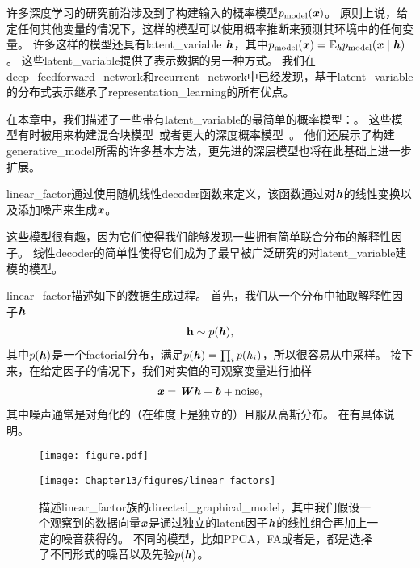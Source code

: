 \chapter{}
\label{chap:linear_factor_models}




许多深度学习的研究前沿涉及到了构建输入的概率模型$p_{\text{model}}(\boldsymbol{\mathit{x}})$。
原则上说，给定任何其他变量的情况下，这样的模型可以使用概率推断来预测其环境中的任何变量。
许多这样的模型还具有\gls{latent_variable} $\boldsymbol{\mathit{h}}$，其中$p_{\text{model}}(\boldsymbol{\mathit{x}}) = \mathbb{E}_{\boldsymbol{\mathit{h}}} p_{\text{model}}(\boldsymbol{\mathit{x}}\mid\boldsymbol{\mathit{h}})$。
这些\gls{latent_variable}提供了表示数据的另一种方式。
我们在\gls{deep_feedforward_network}和\gls{recurrent_network}中已经发现，基于\gls{latent_variable}的分布式表示继承了\gls{representation_learning}的所有优点。


在本章中，我们描述了一些带有\gls{latent_variable}的最简单的概率模型：。
这些模型有时被用来构建混合块模型~\citep{Hinton-nips95,ghahramani96em,Roweis+Saul+Hinton-2002}或者更大的深度概率模型~\citep{tang2012deep}。
他们还展示了构建\gls{generative_model}所需的许多基本方法，更先进的深层模型也将在此基础上进一步扩展。


\gls{linear_factor}通过使用随机线性\gls{decoder}函数来定义，该函数通过对$\boldsymbol{\mathit{h}}$的线性变换以及添加噪声来生成$\boldsymbol{\mathit{x}}$。


这些模型很有趣，因为它们使得我们能够发现一些拥有简单联合分布的解释性因子。 
线性\gls{decoder}的简单性使得它们成为了最早被广泛研究的对\gls{latent_variable}建模的模型。


\gls{linear_factor}描述如下的数据生成过程。 
首先，我们从一个分布中抽取解释性因子$\boldsymbol{\mathit{h}}$
\begin{align}
\label{eqn:131}
\mathbf{h} \sim p(\boldsymbol{\mathit{h}}),
\end{align}
其中$p(\boldsymbol{\mathit{h}})$是一个\gls{factorial}分布，满足$p(\boldsymbol{\mathit{h}}) = \prod_{i}^{}p(h_i)$，所以很容易从中采样。
接下来，在给定因子的情况下，我们对实值的可观察变量进行抽样
\begin{align}
\label{eqn:132}
\boldsymbol{\mathit{x}} = \boldsymbol{\mathit{W}} \boldsymbol{\mathit{h}} + \boldsymbol{\mathit{b}} + \text{noise},
\end{align}
其中噪声通常是对角化的（在维度上是独立的）且服从高斯分布。
在有具体说明。

\begin{figure}[!htb]
\ifOpenSource
\centerline{\texttt{[image: figure.pdf]}}
\else
	\centerline{\texttt{[image: Chapter13/figures/linear\_factors]}}
\fi
\caption{描述\gls{linear_factor}族的\gls{directed_graphical_model}，其中我们假设一个观察到的数据向量$\boldsymbol{\mathit{x}}$是通过独立的\gls{latent}因子$\boldsymbol{\mathit{h}}$的线性组合再加上一定的噪音获得的。
不同的模型，比如\gls{PPCA}，\gls{FA}或者是，都是选择了不同形式的噪音以及先验$p(\boldsymbol{\mathit{h}})$。}
\label{fig:linear_factors}
\end{figure}


